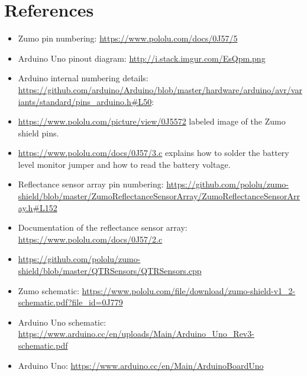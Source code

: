 \documentclass{article}
\begin{document}
\section{References}

\begin{itemize}
  \item
    Zumo pin numbering: \url{https://www.pololu.com/docs/0J57/5}
  \item Arduino Uno pinout diagram: \url{http://i.stack.imgur.com/EsQpm.png}
  \item Arduino internal numbering details:
    \url{https://github.com/arduino/Arduino/blob/master/hardware/arduino/avr/variants/standard/pins_arduino.h#L50}:
  \item \url{https://www.pololu.com/picture/view/0J5572} labeled image of the 
        Zumo shield pins.
  \item \url{https://www.pololu.com/docs/0J57/3.c} explains how to solder the 
        battery level monitor jumper and how to read the battery voltage.
  \item Reflectance sensor array pin numbering:
    \url{https://github.com/pololu/zumo-shield/blob/master/ZumoReflectanceSensorArray/ZumoReflectanceSensorArray.h#L152}
  \item
    Documentation of the reflectance sensor array: 
    \url{https://www.pololu.com/docs/0J57/2.c}
  \item
    \url{https://github.com/pololu/zumo-shield/blob/master/QTRSensors/QTRSensors.cpp}
  \item Zumo schematic:
    \url{https://www.pololu.com/file/download/zumo-shield-v1_2-schematic.pdf?file_id=0J779}
  \item Arduino Uno schematic:
    \url{https://www.arduino.cc/en/uploads/Main/Arduino_Uno_Rev3-schematic.pdf}
  \item Arduino Uno: \url{https://www.arduino.cc/en/Main/ArduinoBoardUno}
\end{itemize}
\end{document}
